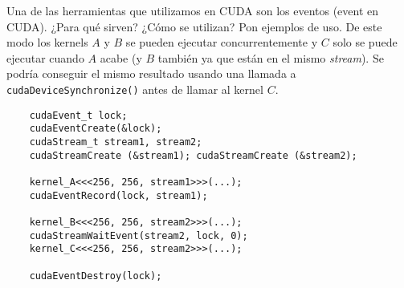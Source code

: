 \begin{pregunta}{Una de las herramientas que utilizamos en CUDA son los eventos (event en
CUDA). ¿Para qué sirven? ¿Cómo se utilizan? Pon ejemplos de uso.}
De este modo los kernels $A$ y $B$ se pueden ejecutar concurrentemente y $C$
solo se puede ejecutar cuando $A$ acabe (y $B$ también ya que están en el mismo
\emph{stream}). Se podría conseguir el mismo resultado usando una llamada a
\texttt{cudaDeviceSynchronize()} antes de llamar al kernel $C$.

\begin{listing}[H]
    \caption{Sincronización de \emph{streams} con \emph{events}}
    \label{lst:kernel-event-streams}
    \begin{verbatim}
    cudaEvent_t lock;
    cudaEventCreate(&lock);
    cudaStream_t stream1, stream2;
    cudaStreamCreate (&stream1); cudaStreamCreate (&stream2);

    kernel_A<<<256, 256, stream1>>>(...);
    cudaEventRecord(lock, stream1);

    kernel_B<<<256, 256, stream2>>>(...);
    cudaStreamWaitEvent(stream2, lock, 0);
    kernel_C<<<256, 256, stream2>>>(...);

    cudaEventDestroy(lock);
    \end{verbatim}
\end{listing}

\end{pregunta}
